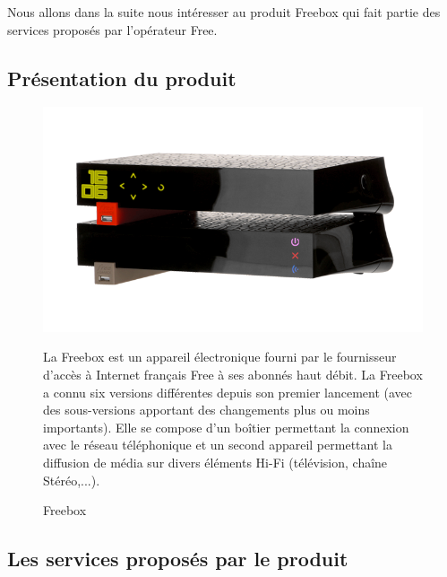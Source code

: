 Nous allons dans la suite nous intéresser au produit \og Freebox \fg qui fait partie des services proposés par l'opérateur Free.

\subsection{Présentation du produit}

\begin{figure}[htbp]
\begin{minipage}[c]{.35\linewidth}
\begin{center}
\includegraphics[width=\linewidth]{img/freebox.png}
\caption{Freebox}
\label{fig:image1}
\end{center}
\end{minipage}
\hfill
\begin{minipage}[c]{.62\linewidth}
La Freebox est un appareil électronique fourni par le fournisseur d'accès à Internet français Free à ses abonnés haut débit. La Freebox a connu six versions différentes depuis son premier lancement (avec des sous-versions apportant des changements plus ou moins importants). Elle se compose d'un boîtier permettant la connexion avec le réseau téléphonique et un second appareil permettant la diffusion de média sur divers éléments Hi-Fi (télévision, chaîne Stéréo,...).
\end{minipage}
\end{figure}

\subsection{Les services proposés par le produit}

